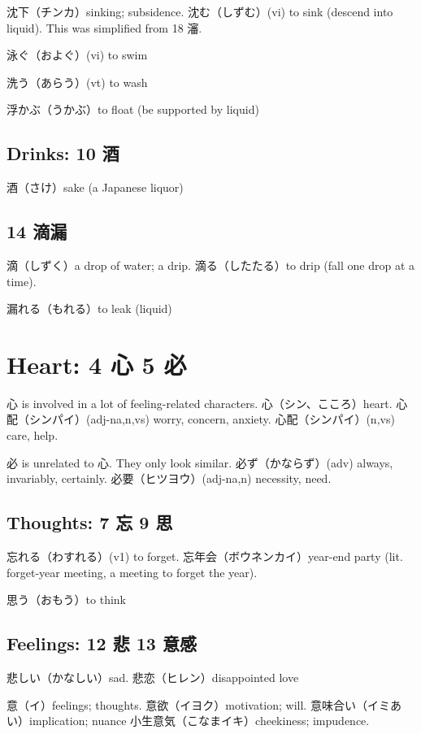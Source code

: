 沈下（チンカ）sinking; subsidence.
沈む（しずむ）(vi) to sink (descend into liquid).
This was simplified from 18 瀋.

泳ぐ（およぐ）(vi) to swim

洗う（あらう）(vt) to wash

浮かぶ（うかぶ）to float (be supported by liquid)

\subsection{Drinks: 10 酒}

酒（さけ）sake (a Japanese liquor)

\subsection{14 滴漏}

滴（しずく）a drop of water; a drip.
滴る（したたる）to drip (fall one drop at a time).

漏れる（もれる）to leak (liquid)

\section{Heart: 4 心 5 必}

心 is involved in a lot of feeling-related characters.
心（シン、こころ）heart.
心配（シンパイ）(adj-na,n,vs) worry, concern, anxiety.
心配（シンパイ）(n,vs) care, help.

必 is unrelated to 心. They only look similar.
必ず（かならず）(adv) always, invariably, certainly.
必要（ヒツヨウ）(adj-na,n) necessity, need.

\subsection{Thoughts: 7 忘 9 思}

忘れる（わすれる）(v1) to forget.
忘年会（ボウネンカイ）year-end party
(lit. forget-year meeting, a meeting to forget the year).

思う（おもう）to think

\subsection{Feelings: 12 悲 13 意感}

悲しい（かなしい）sad.
悲恋（ヒレン）disappointed love

意（イ）feelings; thoughts.
意欲（イヨク）motivation; will.
意味合い（イミあい）implication; nuance
小生意気（こなまイキ）cheekiness; impudence.


